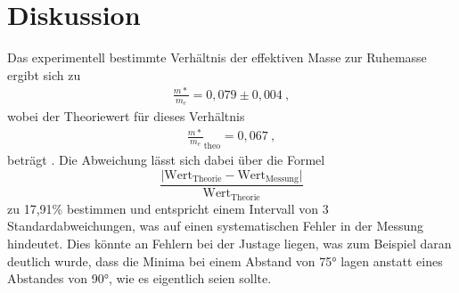 
\section{Diskussion}
\label{sec:Diskussion}
Das experimentell bestimmte Verhältnis der effektiven Masse zur Ruhemasse ergibt sich zu
\begin{align*}
  \frac{m*}{m_e}=0,079\pm0,004 \: ,
\end{align*}
wobei der Theoriewert für dieses Verhältnis
\begin{align*}
  \frac{m*}{m_e}_{\text{theo}}=0,067 \: ,
\end{align*}
beträgt \cite{online2}.
Die Abweichung lässt sich dabei über die Formel
\begin{equation}
  \frac{\lvert \text{Wert}_{\text{Theorie}}-\text{Wert}_{\text{Messung}}\rvert}{\text{Wert}_{\text{Theorie}}}
  \label{eqn:abw}
\end{equation}
zu 17,91\% bestimmen und entspricht einem Intervall von 3 Standardabweichungen,
was auf einen systematischen Fehler in der Messung hindeutet. Dies könnte an Fehlern
bei der Justage liegen, was zum Beispiel
daran deutlich wurde, dass die Minima bei einem Abstand von 75° lagen anstatt
eines Abstandes von 90°, wie es eigentlich seien sollte.
